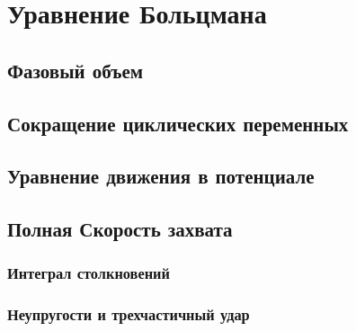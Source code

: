 


	
	\section{Уравнение Больцмана}
	\subsection{Фазовый объем}
	
	\subsection{Сокращение циклических переменных}
	
	\subsection{Уравнение движения в потенциале}
	
	\subsection{Полная Скорость захвата}
		
	\subsubsection{Интеграл столкновений}
	
	\subsubsection{Неупругости и трехчастичный удар}
	
	
